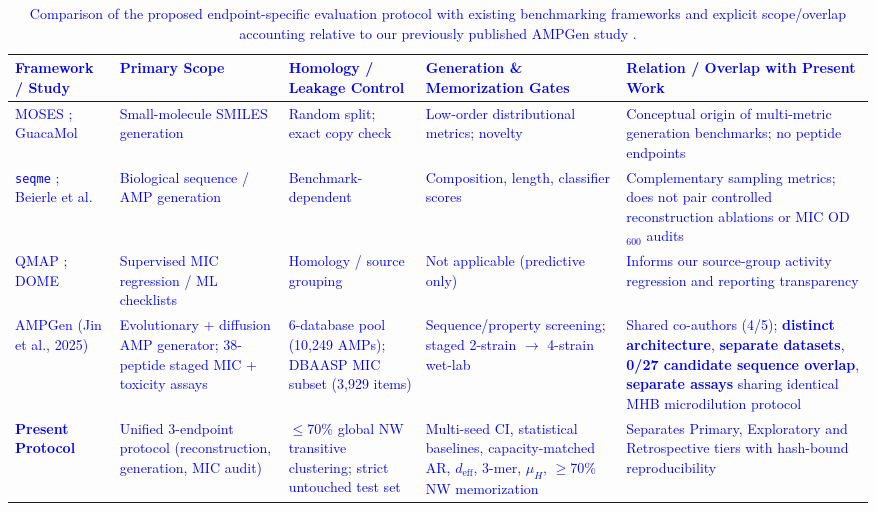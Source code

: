 \documentclass[unnumsec,webpdf,contemporary,large]{oup-authoring-template}
\newcommand{\rev}[1]{\textcolor{blue}{#1}}
\begin{document}
\begin{table}[t]
\caption{\rev{Comparison of the proposed endpoint-specific evaluation protocol with existing benchmarking frameworks and explicit scope/overlap accounting relative to our previously published AMPGen study \cite{ref9}.}}
\label{tab:framework_overlap}
\centering
\footnotesize
\begin{tabular}{>{\raggedright\arraybackslash}p{2.7cm}>{\raggedright\arraybackslash}p{3.0cm}>{\raggedright\arraybackslash}p{3.0cm}>{\raggedright\arraybackslash}p{3.1cm}>{\raggedright\arraybackslash}p{3.3cm}}
\toprule
\rev{Framework / Study} & \rev{Primary Scope} & \rev{Homology / Leakage Control} & \rev{Generation \& Memorization Gates} & \rev{Relation / Overlap with Present Work} \\
\midrule
\rev{MOSES \cite{ref26}; GuacaMol \cite{ref28}} & \rev{Small-molecule SMILES generation} & \rev{Random split; exact copy check} & \rev{Low-order distributional metrics; novelty} & \rev{Conceptual origin of multi-metric generation benchmarks; no peptide endpoints} \\
\rev{\texttt{seqme} \cite{ref29}; Beierle et al. \cite{ref8}} & \rev{Biological sequence / AMP generation} & \rev{Benchmark-dependent} & \rev{Composition, length, classifier scores} & \rev{Complementary sampling metrics; does not pair controlled reconstruction ablations or MIC OD$_{600}$ audits} \\
\rev{QMAP \cite{ref13}; DOME \cite{ref43}} & \rev{Supervised MIC regression / ML checklists} & \rev{Homology / source grouping} & \rev{Not applicable (predictive only)} & \rev{Informs our source-group activity regression and reporting transparency} \\
\rev{AMPGen (Jin et al., 2025) \cite{ref9}} & \rev{Evolutionary + diffusion AMP generator; 38-peptide staged MIC + toxicity assays} & \rev{6-database pool (10,249 AMPs); DBAASP MIC subset (3,929 items)} & \rev{Sequence/property screening; staged 2-strain $\rightarrow$ 4-strain wet-lab} & \rev{Shared co-authors (4/5); \textbf{distinct architecture}, \textbf{separate datasets}, \textbf{0/27 candidate sequence overlap}, \textbf{separate assays} sharing identical MHB microdilution protocol} \\
\rev{\textbf{Present Protocol}} & \rev{Unified 3-endpoint protocol (reconstruction, generation, MIC audit)} & \rev{$\leq$70\% global NW transitive clustering; strict untouched test set} & \rev{Multi-seed CI, statistical baselines, capacity-matched AR, $d_{\mathrm{eff}}$, 3-mer, $\mu_H$, $\geq$70\% NW memorization} & \rev{Separates Primary, Exploratory and Retrospective tiers with hash-bound reproducibility} \\
\bottomrule
\end{tabular}
\end{table}
\end{document}
